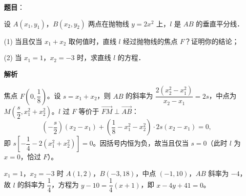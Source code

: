 \begin{answer}

\textbf{题目}：

设 $A(x_1, y_1)$，$B(x_2, y_2)$ 两点在抛物线 $y = 2x^2$ 上，$l$ 是 $AB$ 的垂直平分线．

(1) 当且仅当 $x_1 + x_2$ 取何值时，直线 $l$ 经过抛物线的焦点 $F$？证明你的结论；

(2) 当 $x_1 = 1$，$x_2 = -3$ 时，求直线 $l$ 的方程．

\textbf{解析}


焦点 $F\left(0, \dfrac{1}{8}\right)$。设 $s = x_1 + x_2$，则 $AB$ 的斜率为 $\dfrac{2(x_2^2 - x_1^2)}{x_2 - x_1} = 2s$，中点为 $M\left(\dfrac{s}{2}, x_1^2 + x_2^2\right)$。$l$ 过 $F$ 等价于 $\overrightarrow{FM} \perp \overrightarrow{AB}$：
\nopagebreak[4]
\[
\left(-\frac{s}{2}\right)\left(x_2 - x_1\right) + \left(\frac{1}{8} - x_1^2 - x_2^2\right)\cdot 2s\left(x_2 - x_1\right) = 0,
\]
即 $s\left[-\dfrac{1}{4} - 2\left(x_1^2 + x_2^2\right)\right] = 0$。因括号内恒为负，故当且仅当 $s = 0$（此时 $l$ 为 $x = 0$，恰过 $F$）。


$x_1 = 1$，$x_2 = -3$ 时 $A(1, 2)$，$B(-3, 18)$，中点 $(-1, 10)$，$AB$ 斜率为 $-4$，故 $l$ 的斜率为 $\dfrac{1}{4}$，方程为 $y - 10 = \dfrac{1}{4}(x + 1)$，即 $x - 4y + 41 = 0$。



\end{answer}